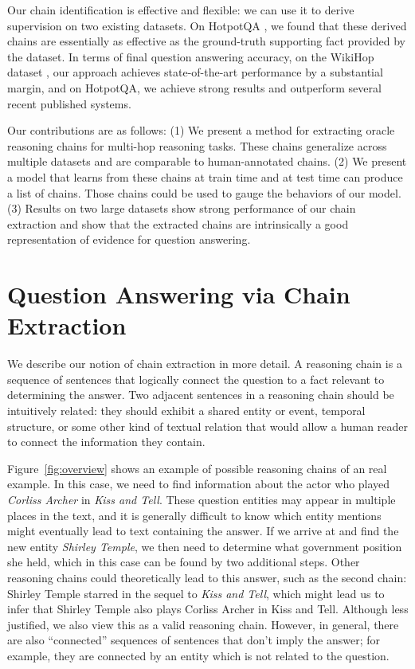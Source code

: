 \documentclass[11pt,a4paper]{article}
\begin{document}
Our chain identification is effective and flexible: we can use it to derive supervision on two existing datasets. On HotpotQA \citep{yang2018hotpotqa}, we found that these derived chains are essentially as effective as the ground-truth supporting fact provided by the dataset. In terms of final question answering accuracy, on the WikiHop dataset \citep{welbl2018constructing}, our approach achieves state-of-the-art performance by a substantial margin, and on HotpotQA, we achieve strong results and outperform several recent published systems.

Our contributions are as follows: (1) We present a method for extracting oracle reasoning chains for multi-hop reasoning tasks. These chains generalize across multiple datasets and are comparable to human-annotated chains. (2) We present a model that learns from these chains at train time and at test time can produce a list of chains. Those chains could be used to gauge the behaviors of our model. (3) Results on two large datasets show strong performance of our chain extraction and show that the extracted chains are intrinsically a good representation of evidence for question answering.

\section{Question Answering via Chain Extraction}

We describe our notion of chain extraction in more detail. A reasoning chain is a sequence of sentences that logically connect the question to a fact relevant to determining the answer. Two adjacent sentences in a reasoning chain should be intuitively related: they should exhibit a shared entity or event, temporal structure, or some other kind of textual relation that would allow a human reader to connect the information they contain.

Figure~\ref{fig:overview} shows an example of possible reasoning chains of an real example. In this case, we need to find information about the actor who played \emph{Corliss Archer} in \emph{Kiss and Tell}. These question entities may appear in multiple places in the text, and it is generally difficult to know which entity mentions might eventually lead to text containing the answer. If we arrive at  and find the new entity \emph{Shirley Temple}, we then need to determine what government position she held, which in this case can be found by two additional steps. Other reasoning chains could theoretically lead to this answer, such as the second chain: Shirley Temple starred in the sequel to \emph{Kiss and Tell}, which might lead us to infer that Shirley Temple also plays Corliss Archer in Kiss and Tell. Although less justified, we also view this as a valid reasoning chain. However, in general, there are also ``connected'' sequences of sentences that don't imply the answer; for example, they are connected by an entity which is not related to the question.
\end{document}

